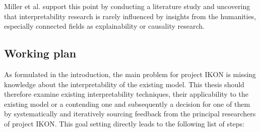 Miller et al. \cite{millerExplainableAIBeware2017} support this point by conducting a literature study and uncovering that interpretability research is rarely influenced by insights from the humanities, especially connected fields as explainability or causality research.


\subsection{Working plan}

As formulated in the introduction, the main problem for project IKON is missing knowledge about the interpretability of the existing model. This thesis should therefore examine existing interpretability techniques, their applicability to the existing model or a contending one and subsequently a decision for one of them by systematically and iteratively sourcing feedback from the principal researchers of project IKON. This goal setting directly leads to the following list of steps:


